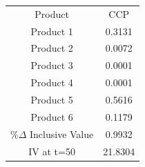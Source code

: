 \begin{tabular}{cc}
Product & CCP \\
Product 1 & 0.3131 \\
Product 2 & 0.0072 \\
Product 3 & 0.0001 \\
Product 4 & 0.0001 \\
Product 5 & 0.5616 \\
Product 6 & 0.1179 \\
$\%\Delta$ Inclusive Value & 0.9932 \\
IV at t=50 & 21.8304 \\
\end{tabular}